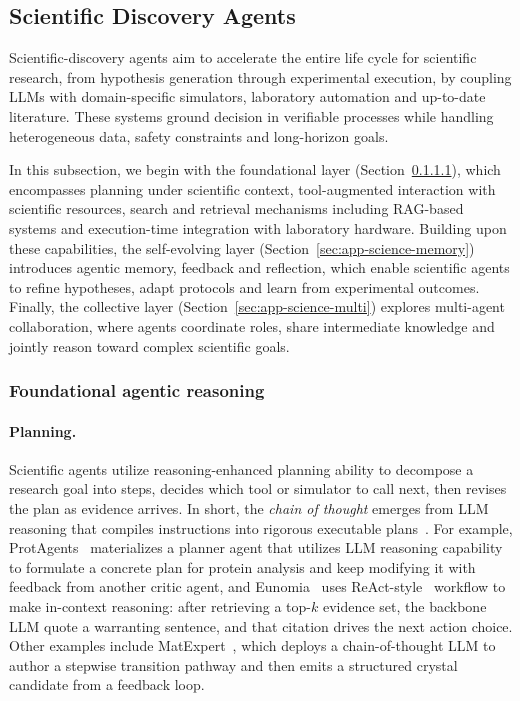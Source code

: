 \subsection{Scientific Discovery Agents}
\label{sec:app-science}
Scientific-discovery agents aim to accelerate the entire life cycle for scientific research, from hypothesis generation through experimental execution, by coupling LLMs with domain-specific simulators, laboratory automation and up-to-date literature. These systems ground decision in verifiable processes while handling heterogeneous data, safety constraints and long-horizon goals.  

In this subsection, we begin with the foundational layer (Section~\ref{sec:app-science-planning}), which encompasses planning under scientific context, tool-augmented interaction with scientific resources, search and retrieval mechanisms including RAG-based systems and execution-time integration with laboratory hardware.
Building upon these capabilities, the self-evolving layer (Section~\ref{sec:app-science-memory}) introduces agentic memory, feedback and reflection, which enable scientific agents to refine hypotheses, adapt protocols and learn from experimental outcomes.
Finally, the collective layer (Section~\ref{sec:app-science-multi}) explores multi-agent collaboration, where agents coordinate roles, share intermediate knowledge and jointly reason toward complex scientific goals.



\subsubsection{Foundational agentic reasoning}
\label{sec:app-science-foundational}


\paragraph{Planning.}
\label{sec:app-science-planning}


Scientific agents utilize reasoning-enhanced planning ability to decompose a research goal into steps, decides which tool or simulator to call next, then revises the plan as evidence arrives. In short, the \textit{chain of thought} emerges from LLM reasoning that compiles instructions into rigorous executable plans~\cite{wei2022chain}.
For example, ProtAgents~\cite{ghafarollahi2024protagents} materializes a planner agent that utilizes LLM reasoning capability to formulate a concrete plan for protein analysis and keep modifying it with feedback from another critic agent, and Eunomia~\cite{ansari2023agentbasedlearningmaterialsdatasets} uses ReAct-style~\cite{yao2023react} workflow to make in-context reasoning: after retrieving a top-$k$ evidence set, the backbone LLM quote a warranting sentence, and that citation drives the next action choice. Other examples include MatExpert~\cite{ding2024matexpertdecomposingmaterialsdiscovery}, which deploys a chain-of-thought LLM to author a stepwise transition pathway and then emits a structured crystal candidate from a feedback loop.

